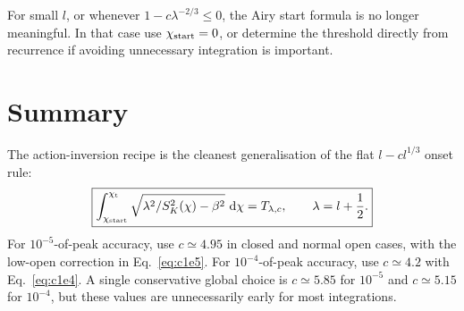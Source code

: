 \documentclass[11pt]{article}
\newcommand{\chip}{\chi_{\rm t}}
\newcommand{\chistart}{\chi_{\rm start}}
\newcommand{\dd}{\,\mathrm{d}}
\begin{document}
For small \(l\), or whenever \(1-c\lambda^{-2/3}\le0\), the Airy start formula
is no longer meaningful.  In that case use \(\chistart=0\), or determine the
threshold directly from recurrence if avoiding unnecessary integration is
important.

\section{Summary}

The action-inversion recipe is the cleanest generalisation of the flat
\(l-c l^{1/3}\) onset rule:
\[
\boxed{
\int_{\chistart}^{\chip}
\sqrt{\lambda^2/S_K^2(\chi)-\beta^2}\,\dd\chi
= T_{\lambda,c},
\qquad
\lambda=l+\frac12.
}
\]
For \(10^{-5}\)-of-peak accuracy, use \(c\simeq4.95\) in closed and normal open
cases, with the low-open correction in Eq.~\eqref{eq:c1e5}.  For
\(10^{-4}\)-of-peak accuracy, use \(c\simeq4.2\) with Eq.~\eqref{eq:c1e4}.
A single conservative global choice is \(c\simeq5.85\) for \(10^{-5}\) and
\(c\simeq5.15\) for \(10^{-4}\), but these values are unnecessarily early for
most integrations.
\end{document}
